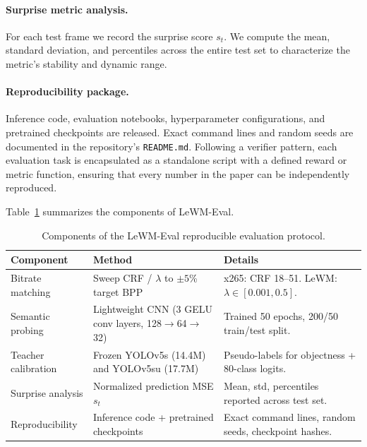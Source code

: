 \documentclass{article}
\begin{document}
\paragraph{Surprise metric analysis.}
For each test frame we record the surprise score $s_t$. We compute the mean, standard deviation, and percentiles across the entire test set to characterize the metric's stability and dynamic range.

\paragraph{Reproducibility package.}
Inference code, evaluation notebooks, hyperparameter configurations, and pretrained checkpoints are released. Exact command lines and random seeds are documented in the repository's \texttt{README.md}. Following a verifier pattern, each evaluation task is encapsulated as a standalone script with a defined reward or metric function, ensuring that every number in the paper can be independently reproduced.

Table~\ref{tab:eval_protocol_summary} summarizes the components of LeWM-Eval.

\begin{table}[ht]
\centering
\caption{Components of the LeWM-Eval reproducible evaluation protocol.}
\label{tab:eval_protocol_summary}
\begin{tabular}{l>{\raggedright\arraybackslash}p{3.2cm}>{\raggedright\arraybackslash}p{5.2cm}}
\toprule
\textbf{Component} & \textbf{Method} & \textbf{Details} \\
\midrule
Bitrate matching    & Sweep CRF / $\lambda$ to $\pm 5$\% target BPP & x265: CRF 18--51. LeWM: $\lambda \in [0.001, 0.5]$. \\
Semantic probing    & Lightweight CNN (3 GELU conv layers, 128$\rightarrow$64$\rightarrow$32) & Trained 50 epochs, 200/50 train/test split. \\
Teacher calibration & Frozen YOLOv5s (14.4M) and YOLOv5su (17.7M)  & Pseudo-labels for objectness + 80-class logits. \\
Surprise analysis   & Normalized prediction MSE $s_t$                 & Mean, std, percentiles reported across test set. \\
Reproducibility     & Inference code + pretrained checkpoints & Exact command lines, random seeds, checkpoint hashes. \\
\bottomrule
\end{tabular}
\end{table}
\end{document}
